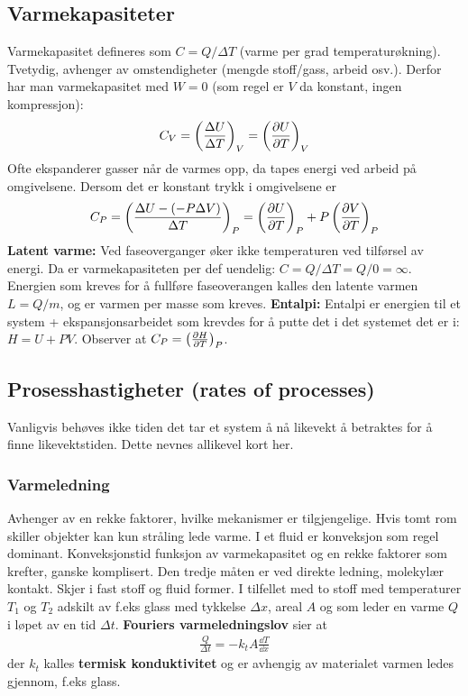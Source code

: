 \documentclass[12pt]{article}
\begin{document}
\subsection{Varmekapasiteter}
Varmekapasitet defineres som $C = Q/\Delta{T}$ (varme per grad temperaturøkning). Tvetydig,
avhenger av omstendigheter (mengde stoff/gass, arbeid osv.). Derfor har man
varmekapasitet med $W = 0$ (som regel er $V$ da konstant, ingen kompressjon):
\begin{align*}
  C_V = \left( \frac{\Delta U}{\Delta T} \right)_V = \left( \pdv{U}{T}\right)_V
\end{align*}
Ofte ekspanderer gasser når de varmes opp, da tapes energi ved arbeid på omgivelsene.
Dersom det er konstant trykk i omgivelsene er
\begin{align*}
  C_P = \left( \frac{\Delta U - (-P\Delta V)}{\Delta T} \right)_P =  \left( \pdv{U}{T}\right)_P + P\left( \pdv{V}{T}\right)_P
\end{align*} \newline \noindent
\textbf{Latent varme:} Ved faseoverganger øker ikke temperaturen ved tilførsel av energi. Da
er varmekapasiteten per def uendelig: $C = Q/\Delta{T} = Q/0 = \infty$. Energien som kreves
for å fullføre faseoverangen kalles den latente varmen $L = Q/m$, og er varmen per
masse som kreves.\newline \noindent
\textbf{Entalpi:} Entalpi er energien til et system + ekspansjonsarbeidet som
krevdes for å putte det i det systemet det er i: $H = U + PV$. Observer at
$C_P = \left( \pdv{H}{T} \right)_P$.
\subsection{Prosesshastigheter (rates of processes)}
Vanligvis behøves ikke tiden det tar et system å nå likevekt å betraktes for å
finne likevektstiden. Dette nevnes allikevel kort her.
\subsubsection{Varmeledning}
Avhenger av en rekke faktorer, hvilke mekanismer er tilgjengelige. Hvis tomt
rom skiller objekter kan kun stråling lede varme. I et fluid er konveksjon
som regel dominant. Konveksjonstid funksjon av varmekapasitet og en rekke
faktorer som krefter, ganske komplisert. Den tredje måten er ved direkte
ledning, molekylær kontakt. Skjer i fast stoff og fluid former. I tilfellet
med to stoff med temperaturer $T_1$ og $T_2$ adskilt av f.eks glass med
tykkelse $\Delta x$, areal $A$ og som leder en varme $Q$ i løpet av en tid $\Delta t$.
\textbf{Fouriers varmeledningslov} sier at
\begin{align*}
  \frac{Q}{\Delta t} = - k_t A \frac{\dd T}{\dd x}
\end{align*}
der $k_t$ kalles \textbf{termisk konduktivitet} og er avhengig av materialet
varmen ledes gjennom, f.eks glass.
\end{document}
